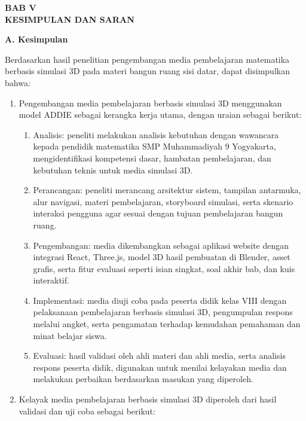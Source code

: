 \begin{center}
    \textbf{BAB V}\\
    \textbf{KESIMPULAN DAN SARAN}
\end{center}

\textbf{A. Kesimpulan}\\
\hspace*{1cm}Berdasarkan hasil penelitian pengembangan media pembelajaran matematika berbasis simulasi 3D pada materi bangun ruang sisi datar, dapat disimpulkan bahwa:
\begin{enumerate}
    \item Pengembangan media pembelajaran berbasis simulasi 3D menggunakan model ADDIE sebagai kerangka kerja utama, dengan uraian sebagai berikut:
    \begin{enumerate}[leftmargin=*, label=\arabic*)]
        \item Analisis: peneliti melakukan analisis kebutuhan dengan wawancara kepada pendidik matematika SMP Muhammadiyah 9 Yogyakarta, mengidentifikasi kompetensi dasar, hambatan pembelajaran, dan kebutuhan teknis untuk media simulasi 3D.
        \item Perancangan: peneliti merancang arsitektur sistem, tampilan antarmuka, alur navigasi, materi pembelajaran, storyboard simulasi, serta skenario interaksi pengguna agar sesuai dengan tujuan pembelajaran bangun ruang.
        \item Pengembangan: media dikembangkan sebagai aplikasi website dengan integrasi React, Three.js, model 3D hasil pembuatan di Blender, asset grafis, serta fitur evaluasi seperti isian singkat, soal akhir bab, dan kuis interaktif.
        \item Implementasi: media diuji coba pada peserta didik kelas VIII dengan pelaksanaan pembelajaran berbasis simulasi 3D, pengumpulan respons melalui angket, serta pengamatan terhadap kemudahan pemahaman dan minat belajar siswa.
        \item Evaluasi: hasil validasi oleh ahli materi dan ahli media, serta analisis respons peserta didik, digunakan untuk menilai kelayakan media dan melakukan perbaikan berdasarkan masukan yang diperoleh.
    \end{enumerate}
    \item Kelayak media pembelajaran berbasis simulasi 3D diperoleh dari hasil validasi dan uji coba sebagai berikut:
    \begin{enumerate}[leftmargin=*, label=\arabic*)]

\end{enumerate}
\end{enumerate}
